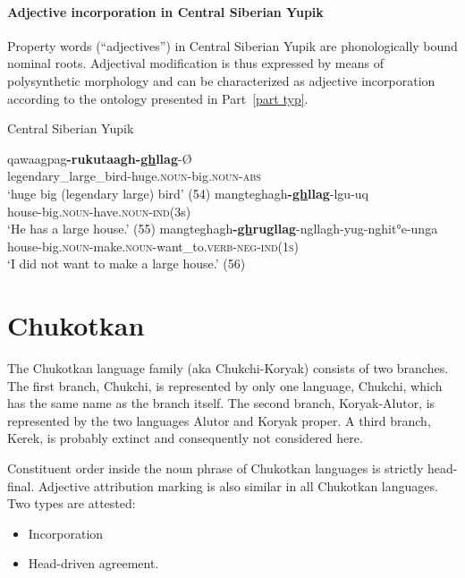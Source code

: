 \paragraph{Adjective incorporation in Central Siberian Yupik}
Property words (“adjectives”) in Central Siberian Yupik are phonologically bound nominal roots. Adjectival modification is thus expressed by means of polysynthetic morphology and can be characterized as adjective incorporation according to the ontology presented in Part~\ref{part typ}.
\begin{exe}
\ex \rm{Central Siberian Yupik \citep{de-reuse1994}}
\begin{xlist}
\ex
\gll	qawaagpag\textbf{-rukutaagh-\underline{gh}llag}-Ø\\
	legendary\_large\_bird-huge.\textsc{noun}-big.\textsc{noun}-\textsc{abs}\\
\glt	‘huge big (legendary large) bird’ (54)
\ex	
\gll	mangteghagh\textbf{-\underline{gh}llag}-lgu-uq\\
	house-big.\textsc{noun}-have.\textsc{noun}-\textsc{ind}(3s)\\
\glt	‘He has a large house.’ (55)
\ex	
\gll	mangteghagh\textbf{-\underline{gh}rugllag}-ngllagh-yug-nghit°e-unga\\
	house-big.\textsc{noun}-make.\textsc{noun}-want\_to.\textsc{verb}-\textsc{neg}-\textsc{ind(1s)}\\
\glt	‘I did not want to make a large house.’ (56)
\end{xlist}
\end{exe}

\section{Chukotkan}
The Chukotkan language family (aka Chukchi-Koryak) consists of two branches. The first branch, Chukchi, is represented by only one language, Chukchi, which has the same name as the branch itself. The second branch, Koryak-Alutor, is represented by the two languages Alutor and Koryak proper. A third branch, Kerek, is probably extinct \cite[253]{salminen2007} and consequently not considered here.

Constituent order inside the noun phrase of Chukotkan languages is strictly head-final. Adjective attribution marking is also similar in all Chukotkan languages. Two types are attested:
\begin{itemize}
\item Incorporation
\item Head-driven agreement.
\end{itemize}

